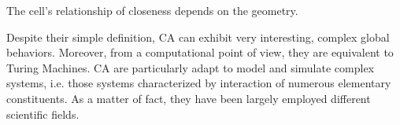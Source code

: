 The cell's relationship of closeness depends on the geometry. 

Despite their simple definition, CA can exhibit very interesting,
complex global behaviors. Moreover, from a computational point of
view, they are equivalent to Turing Machines. CA are particularly
adapt to model and simulate complex systems, i.e. those systems
characterized by interaction of numerous elementary constituents. As a
matter of fact, they have been largely employed different scientific fields.

